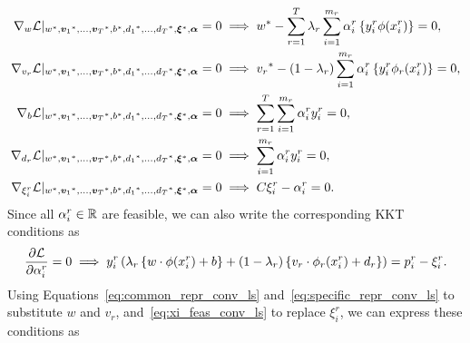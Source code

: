 \begin{align}
    \grad_{{w}} \lagr \vert_{\optim{{w}}, \optim{\fv{v}_1}, \ldots, \optim{\fv{v}_\ntasks}, \optim{b}, \optim{d_1}, \ldots, \optim{d_\ntasks}, \optim{\fv{\xi}}, {\fv{\alpha}}} = 0  &\implies \optim{{w}} - \sum_{r= 1}^\ntasks \lambda_r \sum_{i=1}^{m_r} {\alpha_i^r} \left\lbrace y_i^r \phi(x_i^r) \right\rbrace = 0 , \label{eq:common_repr_conv_ls} \\
    \grad_{{v}_r} \lagr \vert_{\optim{{w}}, \optim{\fv{v}_1}, \ldots, \optim{\fv{v}_\ntasks}, \optim{b}, \optim{d_1}, \ldots, \optim{d_\ntasks}, \optim{\fv{\xi}}, {\fv{\alpha}}} = 0 &\implies \optim{{v}_r} - (1 - \lambda_r) \sum_{i=1}^{m_r} {\alpha_i^r} \left\lbrace y_i^r \phi_r(x_i^r) \right\rbrace = 0 , \label{eq:specific_repr_conv_ls} \\
    \grad_{b} \lagr \vert_{\optim{{w}}, \optim{\fv{v}_1}, \ldots, \optim{\fv{v}_\ntasks}, \optim{b}, \optim{d_1}, \ldots, \optim{d_\ntasks}, \optim{\fv{\xi}}, {\fv{\alpha}}} = 0  &\implies \sum_{r= 1}^T \sum_{i=1}^{m_r} {\alpha_i^r} y_i^r = 0 , \label{eq:specific_eqconstr_conv_ls}  \\
    \grad_{{d}_r} \lagr \vert_{\optim{{w}}, \optim{\fv{v}_1}, \ldots, \optim{\fv{v}_\ntasks}, \optim{b}, \optim{d_1}, \ldots, \optim{d_\ntasks}, \optim{\fv{\xi}}, {\fv{\alpha}}} = 0 &\implies \sum_{i=1}^{m_r} {\alpha_i^r} y_i^r = 0 , \label{eq:common_eqconstr_conv_ls} \\
    \grad_{\xi_i^r} \lagr \vert_{\optim{{w}}, \optim{\fv{v}_1}, \ldots, \optim{\fv{v}_\ntasks}, \optim{b}, \optim{d_1}, \ldots, \optim{d_\ntasks}, \optim{\fv{\xi}}, {\fv{\alpha}}} = 0 &\implies C \xi_i^r - {\alpha_i^r} = 0 . \label{eq:xi_feas_conv_ls}
\end{align}
Since all $\alpha_i^r \in \mathbb{R}$ are feasible, we can also write the corresponding KKT conditions as
\begin{equation}
    \nonumber
    \frac{\partial \mathcal{L}}{\partial \alpha_i^r} = 0 \implies y_{i}^r \left(\lambda_r \left\lbrace {w} \cdot \phi(x_{i}^r) + b  \right\rbrace + (1 - \lambda_r) \left\lbrace {v}_r \cdot \phi_r(x_{i}^r) + d_r \right\rbrace  \right) = p_{i}^r - \xi_{i}^r  .
\end{equation}
Using Equations~\eqref{eq:common_repr_conv_ls} and~\eqref{eq:specific_repr_conv_ls} to substitute $w$ and $v_r$, and~\eqref{eq:xi_feas_conv_ls} to replace $\xi_i^r$, we can express these conditions as 
